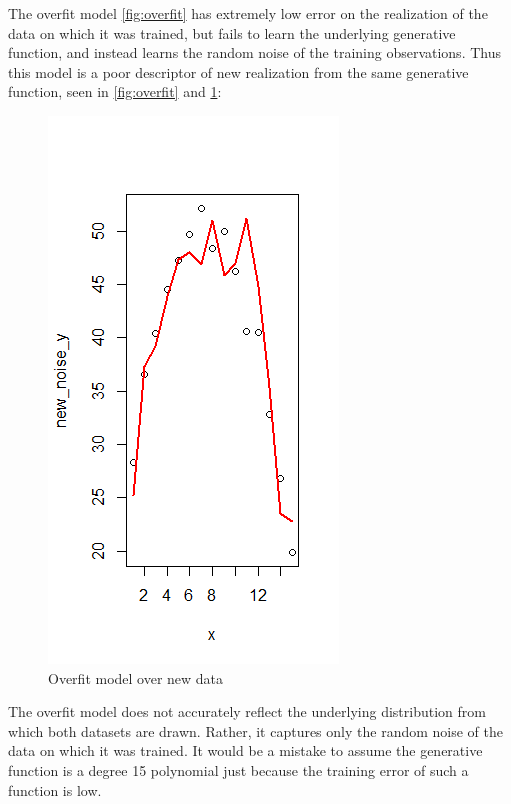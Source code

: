 \documentclass[12pt,twoside]{reedthesis}
\begin{document}
The overfit model \ref{fig:overfit} has extremely low error on the
realization of the data on which it was trained, but fails to learn the
underlying generative function, and instead learns the random noise of
the training observations. Thus this model is a poor descriptor of new
realization from the same generative function, seen in \ref{fig:overfit}
and \ref{fig:overfitre}:
\begin{figure}
\centering
\includegraphics{figure/badfit.png}
\caption{\label{fig:overfitre}Overfit model over new data}
\end{figure}
The overfit model does not accurately reflect the underlying
distribution from which both datasets are drawn. Rather, it captures
only the random noise of the data on which it was trained. It would be a
mistake to assume the generative function is a degree 15 polynomial just
because the training error of such a function is low.
\end{document}
